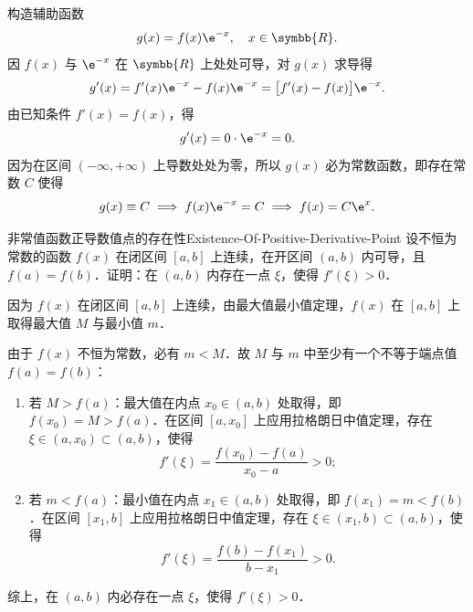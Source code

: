 \begin{myproof}
    构造辅助函数
    \begin{equation}
        g(x) = f(x)\e^{-x}, \quad x \in \symbb{R}.
    \end{equation}
    因 $f(x)$ 与 $\e^{-x}$ 在 $\symbb{R}$ 上处处可导，对 $g(x)$ 求导得
    \begin{equation}
        g'(x) = f'(x)\e^{-x} - f(x)\e^{-x} = \bigl[ f'(x) - f(x) \bigr]\e^{-x}.
    \end{equation}
    由已知条件 $f'(x) = f(x)$，得
    \begin{equation}
        g'(x) = 0 \cdot \e^{-x} = 0.
    \end{equation}
    因为在区间 $(-\infty, +\infty)$ 上导数处处为零，所以 $g(x)$ 必为常数函数，即存在常数 $C$ 使得
    \begin{equation}
        g(x) \equiv C \implies f(x)\e^{-x} = C \implies f(x) = C\e^x.
    \end{equation}
\end{myproof}

\begin{problem}{非常值函数正导数值点的存在性}{Existence-Of-Positive-Derivative-Point}
    设不恒为常数的函数 $f(x)$ 在闭区间 $[a, b]$ 上连续，在开区间 $(a, b)$ 内可导，且 $f(a) = f(b)$．证明：在 $(a, b)$ 内存在一点 $\xi$，使得 $f'(\xi) > 0$．
\end{problem}

\begin{myproof}
    因为 $f(x)$ 在闭区间 $[a, b]$ 上连续，由最大值最小值定理，$f(x)$ 在 $[a, b]$ 上取得最大值 $M$ 与最小值 $m$．

    由于 $f(x)$ 不恒为常数，必有 $m < M$．故 $M$ 与 $m$ 中至少有一个不等于端点值 $f(a) = f(b)$：
    \begin{enumerate}
        \item 若 $M > f(a)$：最大值在内点 $x_0 \in (a, b)$ 处取得，即 $f(x_0) = M > f(a)$．在区间 $[a, x_0]$ 上应用拉格朗日中值定理，存在 $\xi \in (a, x_0) \subset (a, b)$，使得
              \begin{equation}
                  f'(\xi) = \frac{f(x_0) - f(a)}{x_0 - a} > 0;
              \end{equation}
        \item 若 $m < f(a)$：最小值在内点 $x_1 \in (a, b)$ 处取得，即 $f(x_1) = m < f(b)$．在区间 $[x_1, b]$ 上应用拉格朗日中值定理，存在 $\xi \in (x_1, b) \subset (a, b)$，使得
              \begin{equation}
                  f'(\xi) = \frac{f(b) - f(x_1)}{b - x_1} > 0.
              \end{equation}
    \end{enumerate}
    综上，在 $(a, b)$ 内必存在一点 $\xi$，使得 $f'(\xi) > 0$．
\end{myproof}

